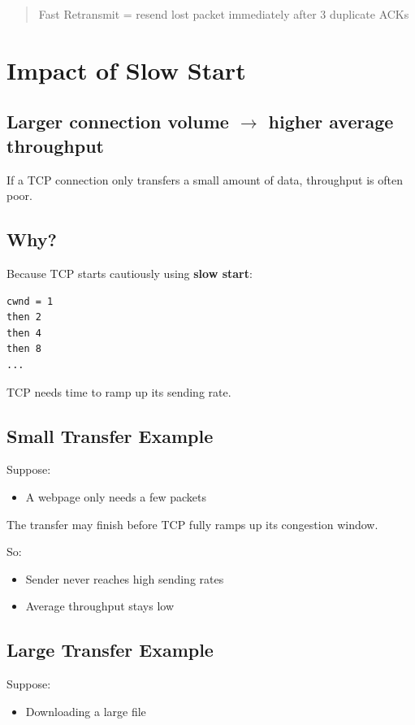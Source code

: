 \begin{quote}
Fast Retransmit = resend lost packet immediately after 3 duplicate ACKs
\end{quote}
\clearpage
\section{Impact of Slow Start}

\subsection*{Larger connection volume $\rightarrow$ higher average throughput}

If a TCP connection only transfers a small amount of data, throughput is often poor.

\subsection*{Why?}

Because TCP starts cautiously using \textbf{slow start}:

\begin{verbatim}
cwnd = 1
then 2
then 4
then 8
...
\end{verbatim}

TCP needs time to ramp up its sending rate.

\subsection{Small Transfer Example}

Suppose:
\begin{itemize}
    \item A webpage only needs a few packets
\end{itemize}

The transfer may finish before TCP fully ramps up its congestion window.

So:
\begin{itemize}
    \item Sender never reaches high sending rates
    \item Average throughput stays low
\end{itemize}

\subsection{Large Transfer Example}

Suppose:
\begin{itemize}
    \item Downloading a large file
\end{itemize}

